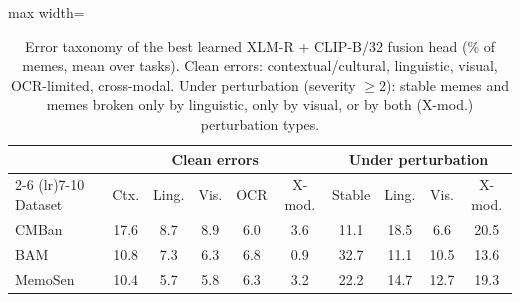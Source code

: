 \begin{table}[t]
\centering
\small
\caption{Error taxonomy of the best learned XLM-R + CLIP-B/32 fusion head (\% of memes, mean over tasks). Clean errors: contextual/cultural, linguistic, visual, OCR-limited, cross-modal. Under perturbation (severity $\geq2$): stable memes and memes broken only by linguistic, only by visual, or by both (X-mod.) perturbation types.}
\label{tab:conf_err}
\begin{adjustbox}{max width=\columnwidth}
\begin{tabular}{lccccccccc}
\toprule
 & \multicolumn{5}{c}{Clean errors} & \multicolumn{4}{c}{Under perturbation} \\
\cmidrule(lr){2-6} \cmidrule(lr){7-10}
Dataset & Ctx. & Ling. & Vis. & OCR & X-mod. & Stable & Ling. & Vis. & X-mod. \\
\midrule
CMBan & 17.6 & 8.7 & 8.9 & 6.0 & 3.6 & 11.1 & 18.5 & 6.6 & 20.5 \\
BAM & 10.8 & 7.3 & 6.3 & 6.8 & 0.9 & 32.7 & 11.1 & 10.5 & 13.6 \\
MemoSen & 10.4 & 5.7 & 5.8 & 6.3 & 3.2 & 22.2 & 14.7 & 12.7 & 19.3 \\
\bottomrule
\end{tabular}
\end{adjustbox}
\end{table}
